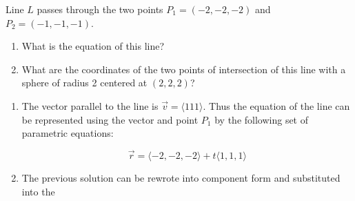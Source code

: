 Line $L$ passes through the two points $P_1=\left(-2,-2,-2\right)$ and $P_2=\left(-1,-1,-1\right)$.
\begin{enumerate}[label=\alph*)]
	\item What is the equation of this line?

	\item What are the coordinates of the two points of intersection of this line with a sphere of radius 2 centered at $\left( 2,2,2\right)$?
\end{enumerate}

\begin{enumerate}[label=\alph*)]
	\item The vector parallel to the line is $\vec{v}=\langle 1 1 1 \rangle$. Thus the equation of the line can be represented using the vector and point $P_1$ by the following set of parametric equations:
	
	\begin{equation*}
	\boxed{
		\vec{r}=\langle -2, -2,-2\rangle +t\langle 1, 1, 1 \rangle}
	\end{equation*}

	\item The previous solution can be rewrote into component form and substituted into the 
\end{enumerate}
